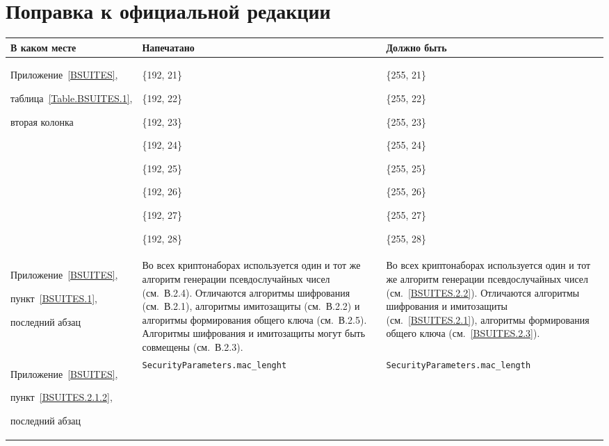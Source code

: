 \clearpage
\chapter*{\mbox{}\hfill Поправка к официальной редакции\hfill\mbox{}}

\mbox{}

\begin{center}
\begin{tabular}{|p{3.5cm}|p{6cm}|p{6cm}|}
\hline
В каком месте & Напечатано & Должно быть\\
\hline
\hline
Приложение~\ref{BSUITES},\par
таблица~\ref{Table.BSUITES.1},\par
вторая колонка
&
\{192, 21\}\par
\{192, 22\}\par
\{192, 23\}\par
\{192, 24\}\par
\{192, 25\}\par
\{192, 26\}\par
\{192, 27\}\par
\{192, 28\}
&
\{255, 21\}\par
\{255, 22\}\par
\{255, 23\}\par
\{255, 24\}\par
\{255, 25\}\par
\{255, 26\}\par
\{255, 27\}\par
\{255, 28\}
\\
\hline
Приложение~\ref{BSUITES},\par
пункт~\ref{BSUITES.1},\par
последний абзац
&
Во всех криптонаборах используется один и тот же алгоритм генерации
псевдослучайных чисел (см.~В.2.4). Отличаются алгоритмы шифрования (см.~В.2.1),
алгоритмы имитозащиты (см.~В.2.2) и алгоритмы формирования общего ключа
(см.~В.2.5). Алгоритмы шифрования и имитозащиты могут быть совмещены
(см.~В.2.3).
&
Во всех криптонаборах используется один и тот же алгоритм генерации
псевдослучайных чисел (см.~\ref{BSUITES.2.2}). Отличаются алгоритмы шифрования и
имитозащиты (см.~\ref{BSUITES.2.1}), алгоритмы формирования общего ключа
(см.~\ref{BSUITES.2.3}).
\\
\hline
Приложение~\ref{BSUITES},\par
пункт~\ref{BSUITES.2.1.2},\par
последний абзац
&
\lstinline{SecurityParameters.mac_lenght}
&
\lstinline{SecurityParameters.mac_length}
\\

\end{tabular}
\end{center}
